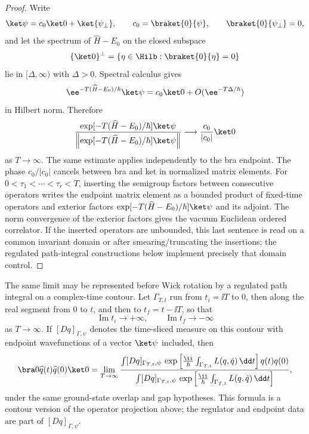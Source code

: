 \begin{proof}
Write
\[
  \ket\psi=c_0\ket0+\ket{\psi_\perp},
  \qquad c_0=\braket{0}{\psi},
  \qquad \braket{0}{\psi_\perp}=0,
\]
and let the spectrum of \(\widehat H-E_0\) on the closed subspace
\[
  \{\ket0\}^\perp
  =
  \{\eta\in\Hilb:\braket{0}{\eta}=0\}
\]
lie in \([\Delta,\infty)\) with \(\Delta>0\).  Spectral calculus gives
\[
  \ee^{-T(\widehat H-E_0)/\hbar}\ket\psi
  =
  c_0\ket0+O(\ee^{-T\Delta/\hbar})
\]
in Hilbert norm.  Therefore
\[
  \frac{\exp[-T(\widehat H-E_0)/\hbar]\ket\psi}
       {\left\|\exp[-T(\widehat H-E_0)/\hbar]\ket\psi\right\|}
  \longrightarrow
  \frac{c_0}{|c_0|}\ket0
\]
as \(T\to\infty\).  The same estimate applies independently to the bra
endpoint.  The phase \(c_0/|c_0|\) cancels between bra and ket in normalized
matrix elements.  For \(0<\tau_1<\cdots<\tau_r<T\), inserting the semigroup
factors between consecutive operators writes the endpoint matrix element as
a bounded product of fixed-time operators and exterior factors
\(\exp[-T(\widehat H-E_0)/\hbar]\ket\psi\) and its adjoint.  The norm
convergence of the exterior factors gives the vacuum Euclidean ordered
correlator.  If the inserted operators are unbounded, this last sentence is
read on a common invariant domain or after smearing/truncating the insertions;
the regulated path-integral constructions below implement precisely that
domain control.
\end{proof}

The same limit may be represented before Wick rotation by a regulated path
integral on a complex-time contour.  Let \(\Gamma_{T,t}\) run from
\(t_i=\ii T\) to \(0\), then along the real segment from \(0\) to \(t\),
and then to \(t_f=t-\ii T\), so that
\[
  \operatorname{Im} t_i\to+\infty,
  \qquad
  \operatorname{Im} t_f\to-\infty
\]
as \(T\to\infty\).  If \([Dq]_{\Gamma,\psi}\) denotes the time-sliced
measure on this contour with endpoint wavefunctions of a vector \(\ket\psi\)
included, then
\[
  \bra 0\widehat q(t)\widehat q(0)\ket 0
  =
  \lim_{T\to\infty}
  \frac{
    \int [Dq]_{\Gamma_{T,t},\psi}\,
    \exp\left[
      \frac{\ii}{\hbar}\int_{\Gamma_{T,t}}
      L(q,\dot q)\,\dd t
    \right]q(t)q(0)
  }{
    \int [Dq]_{\Gamma_{T,t},\psi}\,
    \exp\left[
      \frac{\ii}{\hbar}\int_{\Gamma_{T,t}}
      L(q,\dot q)\,\dd t
    \right]
  },
\]
under the same ground-state overlap and gap hypotheses.  This formula is a
contour version of the operator projection above; the regulator and endpoint
data are part of \([Dq]_{\Gamma,\psi}\).

